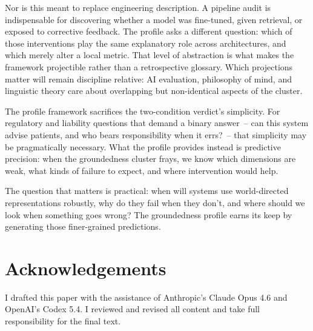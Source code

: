 \documentclass[12pt]{article}
\begin{document}
Nor is this meant to replace engineering description. A pipeline audit is indispensable for discovering whether a model was fine-tuned, given retrieval, or exposed to corrective feedback. The profile asks a different question: which of those interventions play the same explanatory role across architectures, and which merely alter a local metric. That level of abstraction is what makes the framework projectible rather than a retrospective glossary. Which projections matter will remain discipline relative: AI evaluation, philosophy of mind, and linguistic theory care about overlapping but non-identical aspects of the cluster.

The profile framework sacrifices the two-condition verdict's simplicity. For regulatory and liability questions that demand a binary answer~-- can this system advise patients, and who bears responsibility when it errs?~-- that simplicity may be pragmatically necessary. What the profile provides instead is predictive precision: when the groundedness cluster frays, we know which dimensions are weak, what kinds of failure to expect, and where intervention would help.

The question that matters is practical: when will systems use world-directed representations robustly, why do they fail when they don't, and where should we look when something goes wrong? The groundedness profile earns its keep by generating those finer-grained predictions.

\section*{Acknowledgements}

I drafted this paper with the assistance of Anthropic's Claude Opus 4.6 and OpenAI's Codex 5.4. I reviewed and revised all content and take full responsibility for the final text.

\newpage
\printbibliography
\end{document}
